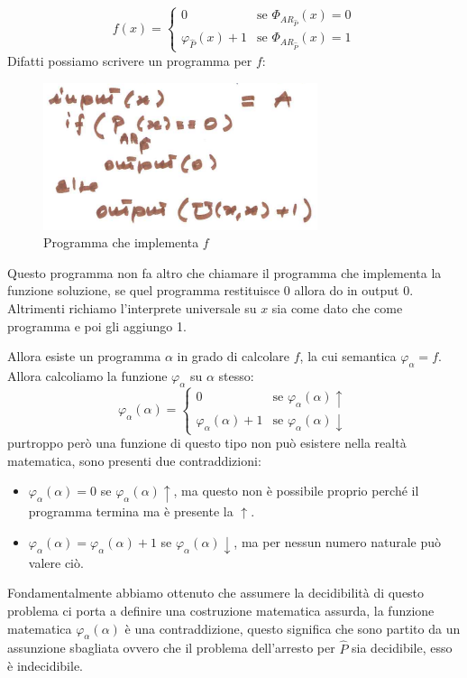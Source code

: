 \documentclass{article}
\begin{document}
\[
    f(x)=
    \begin{cases}
        0                      & \text{se }\Phi_{AR_{\hat{P}}}(x)=0  \\
        \varphi_{\hat{P}}(x)+1 & \text{se } \Phi_{AR_{\hat{P}}}(x)=1
    \end{cases}
\]
Difatti possiamo scrivere un programma per $f$:
\begin{figure}[H]
    \centering
    \includegraphics[scale=0.65]{images/prog_f.png}
    \caption{Programma che implementa $f$}
\end{figure}
Questo programma non fa altro che chiamare il programma che implementa
la funzione soluzione, se quel programma restituisce 0 allora do in output 0.
Altrimenti richiamo l'interprete universale su $x$ sia come dato che come programma
e poi gli aggiungo 1.

Allora esiste un programma $\alpha$ in grado di calcolare $f$, la cui semantica
$\varphi_\alpha=f$. Allora calcoliamo la funzione $\varphi_\alpha$ su $\alpha$
stesso:
\[
    \varphi_\alpha(\alpha)=
    \begin{cases}
        0                        & \text{se }\varphi_\alpha(\alpha)\uparrow   \\
        \varphi_\alpha(\alpha)+1 & \text{se }\varphi_\alpha(\alpha)\downarrow
    \end{cases}
\]
purtroppo però una funzione di questo tipo non può esistere nella realtà matematica,
sono presenti due contraddizioni:
\begin{itemize}
    \item $\varphi_\alpha(\alpha)=0$ se $\varphi_\alpha(\alpha)\uparrow$, ma questo non è possibile
proprio perché il programma termina ma è presente la $\uparrow$.
\item $\varphi_\alpha(\alpha)=\varphi_\alpha(\alpha)+1$ se $\varphi_\alpha(\alpha)\downarrow$, ma per
nessun numero naturale può valere ciò.
\end{itemize}
Fondamentalmente abbiamo ottenuto che assumere la decidibilità di questo problema ci porta
a definire una costruzione matematica assurda, la funzione matematica $\varphi_\alpha(\alpha)$
è una contraddizione, questo significa che sono partito da un assunzione sbagliata ovvero
che il problema dell'arresto per $\hat{P}$ sia decidibile, esso è indecidibile.
\end{document}
